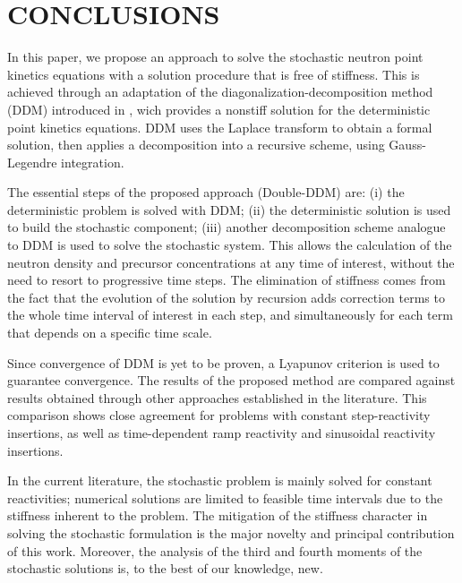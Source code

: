\documentclass[preprint,12pt,authoryear]{elsarticle}
\begin{document}
\section{CONCLUSIONS}
\label{sec6}
\setcounter{section}{6} 
\setcounter{equation}{0} 

In this paper, we propose an approach to solve the stochastic neutron point kinetics equations with a solution procedure that is free of stiffness.
This is achieved through an adaptation of the diagonalization-decomposition method (DDM) introduced in \citet{wollmann_14}, wich provides a nonstiff solution for the deterministic point kinetics equations.
DDM uses the Laplace transform to obtain a formal solution, then applies a decomposition into a recursive scheme, using Gauss-Legendre integration.

The essential steps of the proposed approach (Double-DDM) are: (i) the deterministic problem is solved with DDM; (ii) the deterministic solution is used to build the stochastic component; (iii) another decomposition scheme analogue to DDM is used to solve the stochastic system.
This allows the calculation of the neutron density and precursor concentrations at any time of interest, without the need to resort to progressive time steps.
The elimination of stiffness comes from the fact that the evolution of the solution by recursion adds correction terms to the whole time interval of interest in each step, and simultaneously for each term that depends on a specific time scale.

Since convergence of DDM is yet to be proven, a Lyapunov criterion is used to guarantee convergence.
The results of the proposed method are compared against results obtained through other approaches established in the literature.
This comparison shows close agreement for problems with constant step-reactivity insertions, as well as time-dependent ramp reactivity and sinusoidal reactivity insertions.

In the current literature, the stochastic problem is mainly solved for constant reactivities; numerical solutions are limited to feasible time intervals due to the stiffness inherent to the problem.
The mitigation of the stiffness character in solving the stochastic formulation is the major novelty and principal contribution of this work.
Moreover, the analysis of the third and fourth moments of the stochastic solutions is, to the best of our knowledge, new.
\end{document}
